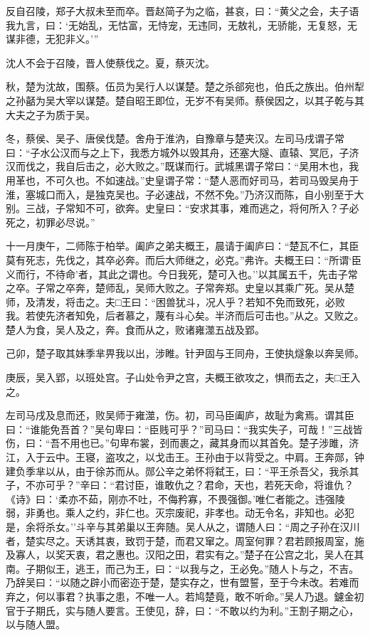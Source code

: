 \documentclass[]{article}
\begin{document}
反自召陵，郑子大叔未至而卒。晋赵简子为之临，甚哀，曰：``黄父之会，夫子语我九言，曰：`无始乱，无怙富，无恃宠，无违同，无敖礼，无骄能，无复怒，无谋非德，无犯非义。'''

沈人不会于召陵，晋人使蔡伐之。夏，蔡灭沈。

秋，楚为沈故，围蔡。伍员为吴行人以谋楚。楚之杀郤宛也，伯氏之族出。伯州犁之孙嚭为吴大宰以谋楚。楚自昭王即位，无岁不有吴师。蔡侯因之，以其子乾与其大夫之子为质于吴。

冬，蔡侯、吴子、唐侯伐楚。舍舟于淮汭，自豫章与楚夹汉。左司马戌谓子常曰：``子水公汉而与之上下，我悉方城外以毁其舟，还塞大隧、直辕、冥厄，子济汉而伐之，我自后击之，必大败之。''既谋而行。武城黑谓子常曰：``吴用木也，我用革也，不可久也。不如速战。''史皇谓子常：``楚人恶而好司马，若司马毁吴舟于淮，塞城口而入，是独克吴也。子必速战，不然不免。''乃济汉而陈，自小别至于大别。三战，子常知不可，欲奔。史皇曰：``安求其事，难而逃之，将何所入？子必死之，初罪必尽说。''

十一月庚午，二师陈于柏举。阖庐之弟夫概王，晨请于阖庐曰：``楚瓦不仁，其臣莫有死志，先伐之，其卒必奔。而后大师继之，必克。''弗许。夫概王曰：``所谓`臣义而行，不待命'者，其此之谓也。今日我死，楚可入也。''以其属五千，先击子常之卒。子常之卒奔，楚师乱，吴师大败之。子常奔郑。史皇以其乘广死。吴从楚师，及清发，将击之。夫□王曰：``困兽犹斗，况人乎？若知不免而致死，必败我。若使先济者知免，后者慕之，蔑有斗心矣。半济而后可击也。''从之。又败之。楚人为食，吴人及之，奔。食而从之，败诸雍澨五战及郢。

己卯，楚子取其妹季芈畀我以出，涉睢。针尹固与王同舟，王使执燧象以奔吴师。

庚辰，吴入郢，以班处宫。子山处令尹之宫，夫概王欲攻之，惧而去之，夫□王入之。

左司马戌及息而还，败吴师于雍澨，伤。初，司马臣阖庐，故耻为禽焉。谓其臣曰：``谁能免吾首？''吴句卑曰：``臣贱可乎？''司马曰：``我实失子，可哉！''三战皆伤，曰：``吾不用也已。''句卑布裳，刭而裹之，藏其身而以其首免。楚子涉雎，济江，入于云中。王寝，盗攻之，以戈击王。王孙由于以背受之。中肩。王奔郧，钟建负季芈以从，由于徐苏而从。郧公辛之弟怀将弑王，曰：``平王杀吾父，我杀其子，不亦可乎？''辛曰：``君讨臣，谁敢仇之？君命，天也，若死天命，将谁仇？《诗》曰：`柔亦不茹，刚亦不吐，不侮矜寡，不畏强御。'唯仁者能之。违强陵弱，非勇也。乘人之约，非仁也。灭宗废祀，非孝也。动无令名，非知也。必犯是，余将杀女。''斗辛与其弟巢以王奔随。吴人从之，谓随人曰：``周之子孙在汉川者，楚实尽之。天诱其衷，致罚于楚，而君又窜之。周室何罪？君若顾报周室，施及寡人，以奖天衷，君之惠也。汉阳之田，君实有之。''楚子在公宫之北，吴人在其南。子期似王，逃王，而己为王，曰：``以我与之，王必免。''随人卜与之，不吉。乃辞吴曰：``以随之辟小而密迩于楚，楚实存之，世有盟誓，至于今未改。若难而弃之，何以事君？执事之患，不唯一人。若鸠楚竟，敢不听命。''吴人乃退。鑢金初官于子期氏，实与随人要言。王使见，辞，曰：``不敢以约为利。''王割子期之心，以与随人盟。
\end{document}
